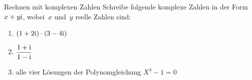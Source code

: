 \documentclass{algblatt}
\begin{document}
\begin{aufgabe}{Rechnen mit komplexen Zahlen}
Schreibe folgende komplexe Zahlen in der Form~$x + y \mathrm{i}$, wobei~$x$ und~$y$
reelle Zahlen sind:
\begin{enumerate}
\item $(1 + 2 \mathrm{i}) \cdot (3 - 4 \mathrm{i})$
\item $\dfrac{1 + \mathrm{i}}{1 - \mathrm{i}}$
\item alle vier Lösungen der Polynomgleichung $X^4 - 1 = 0$
\end{enumerate}
\end{aufgabe}
\end{document}
